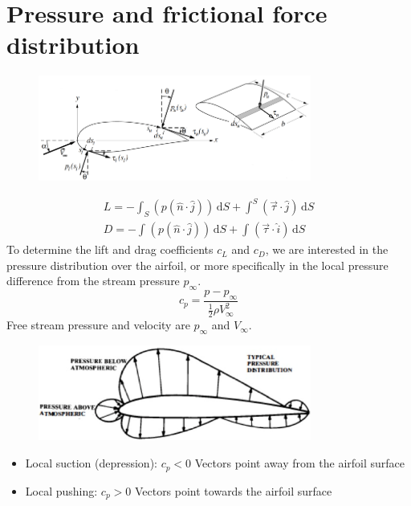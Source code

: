 \documentclass[class=report, crop=false, 12pt,a4paper]{standalone}
\begin{document}
\section{Pressure and frictional force distribution}
\begin{figure}[H]
  \centering
  \includegraphics[width = 0.8\textwidth]{../img/diagram10.png}
\end{figure}
\begin{gather}
  L = - \int_{S}^{} \left( p (\hat{n}\cdot \hat{j}) \right)  \,\mathrm{d}S + \int_{}^{S} \left( \vec{\tau} \cdot \hat{j} \right)  \,\mathrm{d}S\\
  D = - \int_{}^{} \left(  p (\hat{n} \cdot \hat{j})\right)  \,\mathrm{d}S  + \int_{}^{} \left(\vec{\tau} \cdot \hat{i} \right)  \,\mathrm{d}S 
\end{gather}
To determine the lift and drag coefficients $c_L$ and $c_D$, we are interested in the pressure distribution over the airfoil, or more specifically in the local pressure difference from the stream pressure $p_{\infty}$.
\begin{equation}
  c_p = \frac{p - p_{\infty}}{\frac{1}{2} \rho V_{\infty}^2}
\end{equation}
Free stream pressure and velocity are $p_\infty$ and $V_\infty$.
\begin{figure}[H]
  \centering
  \includegraphics[width = 0.8\textwidth]{../img/diagram11.png}
\end{figure}
\begin{itemize}
  \item Local suction (depression): $c_p < 0$ Vectors point away from the airfoil surface
  \item Local pushing: $c_p > 0$ Vectors point towards the airfoil surface
\end{itemize}
\end{document}
